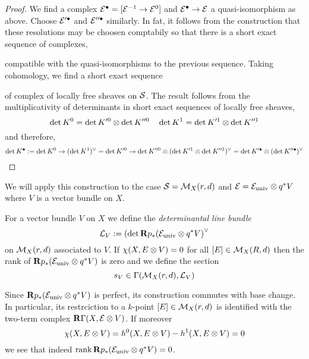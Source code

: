 \documentclass[12pt]{article}
\begin{document}
\begin{proof}
We find a complex $\E^\bullet = [\E^{-1} \to \E^0]$ and $\E^\bullet \to \E$ a quasi-isomorphism as above. Choose $\E'^\bullet$ and $\E''^\bullet$ similarly. In fat, it follows from the construction that these resolutions may be choosen comptabily so that there is a short exact sequence of complexes,
\begin{center}
\end{center}
compatible with the quasi-isomorphisms to the previous sequence. Taking cohomology, we find a short exact sequence
\begin{center}
\end{center}
of complex of locally free sheaves on $\S$. The result follows from the multiplicativity of determinants in short exact sequences of locally free sheaves,
\[ \det{K^0} = \det{K'^0} \ot \det{K''^0} \quad \det{K^1} = \det{K'^1} \ot \det{K''^1} \]
and therefore,
\[ \det{K^\bullet} := \det{K^0} \to (\det{K^1})^\vee = \det{K'^0} \to \det{K''^0} \ot (\det{K'^1} \ot \det{K''^1})^\vee = \det{K'^\bullet} \ot (\det{K''^\bullet})^\vee \]
\end{proof}


We will apply this construction to the case $\S = \M_X(r,d)$ and $\E = \E_{\univ} \ot q^* V$ where $V$ is a vector bundle on $X$. 

\begin{defn}
For a vector bundle $V$ on $X$ we define the \textit{determinantal line bundle}
\[ \L_V := (\det{\R p_* (\E_{\univ} \ot q^* V)}^\vee \]
on $\M_X(r,d)$ associated to $V$. If $\chi(X, E \ot V) = 0$ for all $[E] \in \M_X(R,d)$
then the rank of $\R p_* (\E_{\univ} \ot q^* V)$ is zero and we define the section
\[ s_V \in \Gamma(\M_X(r,d), \L_V) \]
\end{defn}

\begin{rmk}
Since $\R p_* (\E_{\univ} \ot q^* V)$ is perfect, its construction commutes with base change. In particular, its restrciction to a $k$-point $[E] \in \M_X(r,d)$ is identified with the two-term complex $\R \Gamma(X, \E \ot V)$. If moreover
\[ \chi(X, E \ot V) = h^0(X, E \ot V) - h^1(X, E \ot V) = 0 \]
we see that indeed $\rank{\R p_* (\E_{\univ} \ot q^* V)} = 0$.
\end{rmk}
\end{document}
